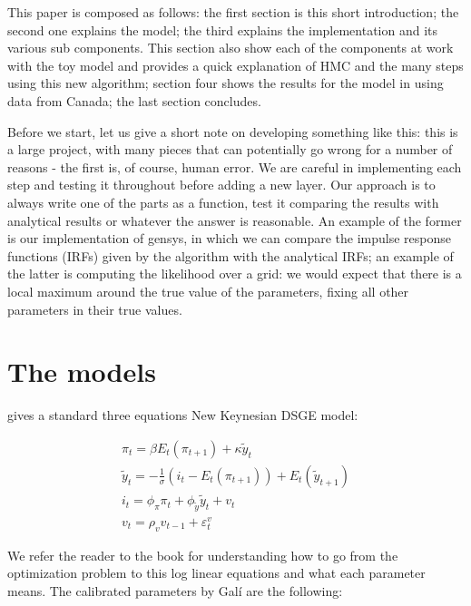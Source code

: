 \documentclass[12pt,a4paper]{article}
\begin{document}
This paper is composed as follows: the first section is this short introduction; the second one explains the model; the third explains the implementation and its various sub components. This section also show each of the components at work with the toy model and provides a quick explanation of HMC and the many steps using this new algorithm; section four shows the results for the model in \cite{carvalho2015} using data from Canada; the last section concludes.

Before we start, let us give a short note on developing something like this: this is a large project, with many pieces that can potentially go wrong for a number of reasons - the first is, of course, human error. We are careful in implementing each step and testing it throughout before adding a new layer. Our approach is to always write one of the parts as a function, test it comparing the results with analytical results or whatever the answer is reasonable. An example of the former is our implementation of gensys, in which we can compare the impulse response functions (IRFs) given by the algorithm with the analytical IRFs; an example of the latter is computing the likelihood over a grid: we would expect that there is a local maximum around the true value of the parameters, fixing all other parameters in their true values.

\section{The models}
\cite{Gali2009} gives a standard three equations New Keynesian DSGE model:

\begin{align} 
\pi_t = \beta E_t(\pi_{t+1}) + \kappa \tilde{y}_t\\
\tilde{y}_t = -\frac{1}{\sigma} (i_t - E_t(\pi_{t+1})) + E_t(\tilde{y}_{t+1})\\
i_t = \phi_{\pi} \pi_t + \phi_{\tilde{y}} \tilde{y}_t + v_t\\
v_t = \rho_v v_{t-1} + \varepsilon_t^v
\end{align}

We refer the reader to the book for understanding how to go from the optimization problem to this log linear equations and what each parameter means. The calibrated parameters by Galí are the following:
\end{document}
